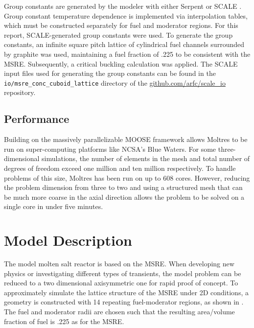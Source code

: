\documentclass{article}
\let\Oldsection\section
\renewcommand{\section}{\FloatBarrier\Oldsection}
\let\Oldsubsection\subsection
\renewcommand{\subsection}{\FloatBarrier\Oldsubsection}
\newcommand{\code}[1]{\texttt{#1}}
\begin{document}
Group constants are generated by the modeler with either Serpent
\cite{leppanen_serpent_2015} or SCALE \cite{dehart_reactor_2011}. Group constant
temperature dependence is implemented via interpolation tables, which must be
constructed separately for fuel and moderator regions. For this report,
SCALE-generated group constants were used. To generate the group constants, an
infinite square pitch lattice of cylindrical fuel channels surrounded by
graphite was used, maintaining a fuel fraction of .225 to be consistent with the
\gls{MSRE}. Subsequently, a critical buckling calculation was applied. The SCALE
input files used for generating the group constants can be found in the
\code{io/msre\_conc\_cuboid\_lattice} directory of the
\url{github.com/arfc/scale_io} repository.

\subsection{Performance}

Building on the massively parallelizable \gls{MOOSE} framework allows Moltres
to be run on super-computing platforms like \gls{NCSA}'s Blue Waters. For some
three-dimensional simulations, the number of
elements in the mesh and total number of degrees of freedom exceed one million
and ten million respectively. To handle problems of this size, Moltres has been
run on up to 608 cores. However, reducing the problem dimension from three to
two and using a structured mesh that can be much more coarse in the axial
direction allows the problem to be solved on a single core in under
five minutes.

\section{Model Description}

The model molten salt
reactor is based on the \gls{MSRE}. When developing new physics or investigating
different types of transients, the model problem can be reduced to a two
dimensional axisymmetric one for rapid proof of concept. To approximately simulate the lattice
structure of the \gls{MSRE} under 2D conditions, a geometry is constructed with 14 repeating
fuel-moderator regions, as shown in . The fuel and moderator
radii are chosen such that the resulting area/volume fraction of fuel is .225 as
for the \gls{MSRE}.
\end{document}
